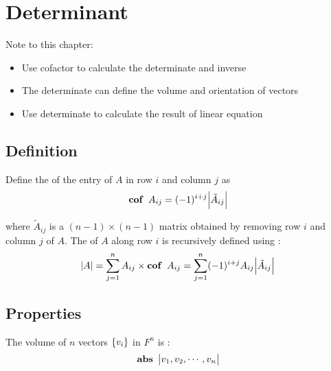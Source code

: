 \chapter{Determinant}

Note to this chapter:
\begin{itemize}
    \item Use cofactor to calculate the determinate and inverse
    \item The determinate can define the volume and orientation of vectors
    \item Use determinate to calculate the result of linear equation
\end{itemize}

\section{Definition}

\begin{definition}
    Define the  of the entry of $A$ in row $i$ and column $j$ as
    \begin{equation}
        \displaystyle \mathop{\bf cof\/}~\displaystyle A_{ij} = (-1)^{i+j}\abs{\tilde{A}_{ij}}
    \end{equation}
    
    where $\tilde{A}_{ij}$ is a $(n-1)\times (n-1)$ matrix obtained by removing row $i$ and column $j$ of $A$. The  of $A$ along row $i$ is recursively defined using :
    \begin{equation}
    \abs{A} = \sum_{j=1}^n A_{ij} \times \displaystyle \mathop{\bf cof\/}~\displaystyle A_{ij} = \sum_{j=1}^n (-1)^{i+j} A_{ij}  \abs{\tilde{A}_{ij}}
    \end{equation}
\end{definition}




\section{Properties}

\begin{theorem}
    The volume of $n$ vectors $\set{v_i}$ in $F^n$ is :
    \begin{equation}
      \mathop{\bf abs\/}~\begin{vmatrix}
            v_1, v_2, \cdots,  v_n
        \end{vmatrix}
    \end{equation}
\end{theorem}

